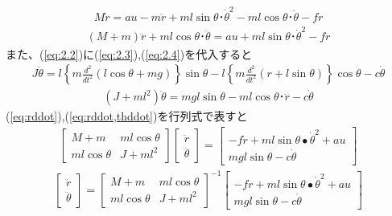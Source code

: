 \documentclass[a4j,11pt,twoside]{ujbook}
\begin{document}
			\begin{eqnarray*}
				M\ddot{r} = au - m\ddot{r}+ml\sin{\theta} ･ {\dot{\theta}}^2 - ml\cos{\theta}･\ddot{\theta}-f\dot{r}
			\end{eqnarray*}
			\begin{eqnarray}
			\left( M+m \right) \ddot{r} + ml\cos{\theta}･\ddot{\theta} = au + ml\sin{\theta} ･ {\dot{\theta}}^2-f\dot{r}
			\label{eq:rddot}
			\end{eqnarray}
			また、(\ref{eq:2.2})に(\ref{eq:2.3}),(\ref{eq:2.4})を代入すると
			\begin{eqnarray*}
				J\ddot{\theta} = l\left\lbrace  m\frac{d^2}{dt^2}\left(l\cos{\theta}+mg\right) \right\rbrace\sin{\theta}
				- l \left\lbrace m\frac{d^2}{dt^2}(r+l\sin{\theta}) \right\rbrace\cos{\theta}-c\dot{\theta}
			\end{eqnarray*}
			\begin{eqnarray}
				(J+ml^2)\ddot{\theta}=mgl\sin{\theta}-ml\cos{\theta}･\ddot{r}-c\dot{\theta}
				\label{eq:rddot,thddot}
			\end{eqnarray}
			(\ref{eq:rddot}),(\ref{eq:rddot,thddot})を行列式で表すと
			\begin{eqnarray*}
				\left[
					\begin{array}{cc}
						M+m & ml\cos{\theta}\\
						ml\cos{\theta} & J+ml^2
					\end{array}
				\right]
				\left[
					\begin{array}{c}
						\ddot{r} \\
						\ddot{\theta}
					\end{array}
				\right] 
				=
				\left[
					\begin{array}{c}
						- f \dot{r} + ml\sin{\theta}\bullet\dot{\theta}^2 + au\\
						mgl\sin{\theta} - c\dot{\theta}
					\end{array}
				\right]
			\end{eqnarray*}
			\begin{eqnarray*}
				\left[
					\begin{array}{c}
						\ddot{r} \\
						\ddot{\theta}
					\end{array}
				\right]
				 =
				\left[
					\begin{array}{cc}
						M+m & ml\cos{\theta}\\
						ml\cos{\theta} & J+ml^2
					\end{array}
				\right]^{-1}
				\left[
					\begin{array}{c}
						- f \dot{r} + ml\sin{\theta}\bullet\dot{\theta}^2 + au\\
						mgl\sin{\theta} - c\dot{\theta}
					\end{array}
				\right]
			\end{eqnarray*}
\end{document}
